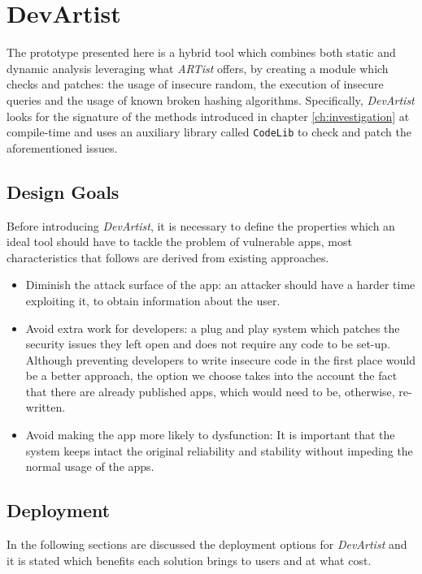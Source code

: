 \chapter{DevArtist}
\label{ch:devartist}
The prototype presented here is a hybrid tool which combines both static and dynamic analysis leveraging what \emph{ARTist} offers, by creating a module which checks and patches: the usage of insecure random, the execution of insecure queries and the usage of known broken hashing algorithms. Specifically, \emph{DevArtist} looks for the signature of the methods introduced in chapter \ref{ch:investigation} at compile-time and uses an auxiliary library called \texttt{CodeLib} to check and patch the aforementioned issues.

\section{Design Goals}
Before introducing \emph{DevArtist}, it is necessary to define the properties which an ideal tool should have to tackle the problem of vulnerable apps, most characteristics that follows are derived from existing approaches.
\begin{itemize}
	\item{Diminish the attack surface of the app: an attacker should have a harder time exploiting it, to obtain information about the user.}
	\item{Avoid extra work for developers: a plug and play system which patches the security issues they left open and does not require any code to be set-up. Although preventing developers to write insecure code in the first place would be a better approach, the option we choose takes into the account the fact that there are already published apps, which would need to be, otherwise, re-written.}
	\item{Avoid making the app more likely to dysfunction: It is important that the system keeps intact the original reliability and stability without impeding the normal usage of the apps.}
\end{itemize}

\section{Deployment}
In the following sections are discussed the deployment options for \emph{DevArtist} and it is stated which benefits each solution brings to users and at what cost. 

